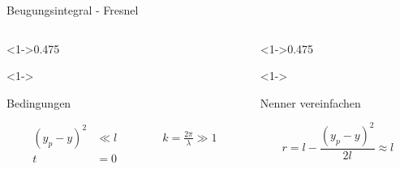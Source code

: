 \begin{frame}{Beugungsintegral - Fresnel}
    \begin{columns}
        \begin{column}<1->{0.475\textwidth}
            \begin{alertblock}<1->{\strut Bedingungen}
                \begin{align*}
                    (y_p - y)^2
                    &\ll
                    l \qquad\qquad k
                    =
                    \frac{2\pi}{\lambda}
                    \gg
                    1
                    \\
                    t
                    &=
                    0
                \end{align*}
            \end{alertblock}
        \end{column}
        \begin{column}<1->{0.475\textwidth}
            \begin{block}<1->{\strut Nenner vereinfachen}
                \begin{equation*}
                    r
                    =
                    l - \frac{(y_p-y)^2}{2l}
                    \approx
                    l
                \end{equation*}
            \end{block}
        \end{column}
    \end{columns}


\end{frame}
